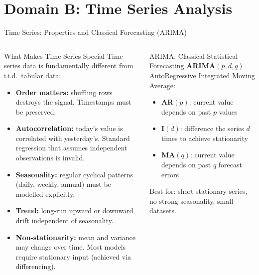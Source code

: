 \documentclass[aspectratio=169,10pt]{beamer}
\begin{document}
\section{Domain B: Time Series Analysis}

\begin{frame}{Time Series: Properties and Classical Forecasting (ARIMA)}
  \begin{columns}[T]
      \begin{block}{What Makes Time Series Special}
        Time series data is fundamentally different from i.i.d.\ tabular data:
        \begin{itemize}
          \item \textbf{Order matters:} shuffling rows destroys the signal.  Timestamps must be preserved.
          \item \textbf{Autocorrelation:} today's value is correlated with yesterday's.  Standard regression that assumes independent observations is invalid.
          \item \textbf{Seasonality:} regular cyclical patterns (daily, weekly, annual) must be modelled explicitly.
          \item \textbf{Trend:} long-run upward or downward drift independent of seasonality.
          \item \textbf{Non-stationarity:} mean and variance may change over time.  Most models require stationary input (achieved via differencing).
        \end{itemize}
      \end{block}
      \vspace{4pt}
      \begin{block}{ARIMA: Classical Statistical Forecasting}
        \small \textbf{ARIMA}$(p,d,q)$ = AutoRegressive Integrated Moving Average:
        \begin{itemize}
          \item \textbf{AR}$(p)$: current value depends on past $p$ values
          \item \textbf{I}$(d)$: difference the series $d$ times to achieve stationarity
          \item \textbf{MA}$(q)$: current value depends on past $q$ forecast errors
        \end{itemize}
        Best for: short stationary series, no strong seasonality, small datasets.
      \end{block}


\end{columns}
\end{frame}
\end{document}

